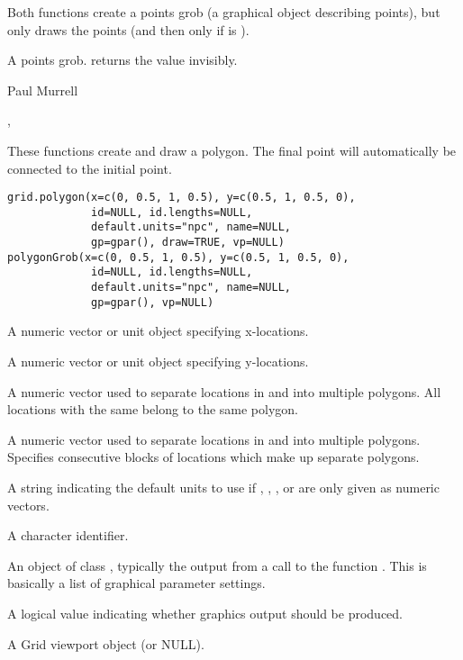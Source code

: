 %
\begin{Details}\relax
Both functions create a points grob (a graphical object describing
points), but only  draws the points (and then only
if  is ).
\end{Details}
%
\begin{Value}
A points grob.   returns the value invisibly.
\end{Value}
%
\begin{Author}\relax
Paul Murrell
\end{Author}
%
\begin{SeeAlso}\relax
{},
\end{SeeAlso}
%
\begin{Description}\relax
These functions create and draw a polygon.
The final point will automatically
be connected to the initial point.
\end{Description}
%
\begin{Usage}
\begin{verbatim}
grid.polygon(x=c(0, 0.5, 1, 0.5), y=c(0.5, 1, 0.5, 0),
             id=NULL, id.lengths=NULL,
             default.units="npc", name=NULL,
             gp=gpar(), draw=TRUE, vp=NULL)
polygonGrob(x=c(0, 0.5, 1, 0.5), y=c(0.5, 1, 0.5, 0),
             id=NULL, id.lengths=NULL,
             default.units="npc", name=NULL,
             gp=gpar(), vp=NULL)
\end{verbatim}
\end{Usage}
%
\begin{Arguments}
\begin{ldescription}
\item[\code{x}] A numeric vector or unit object specifying x-locations.
\item[\code{y}] A numeric vector or unit object specifying y-locations.
\item[\code{id}] A numeric vector used to separate locations in  and
 into multiple polygons.  All locations with the same
 belong to the same polygon.
\item[\code{id.lengths}] A numeric vector used to separate locations in  and
 into multiple polygons.  Specifies consecutive blocks of
locations which make up separate polygons.
\item[\code{default.units}] A string indicating the default units to use
if , , , or 
are only given as numeric vectors. 
\item[\code{name}]  A character identifier. 
\item[\code{gp}] An object of class , typically the output
from a call to the function .  This is basically
a list of graphical parameter settings.
\item[\code{draw}] A logical value indicating whether graphics output
should be produced.
\item[\code{vp}] A Grid viewport object (or NULL).
\end{ldescription}
\end{Arguments}
